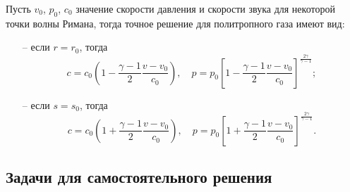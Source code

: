 \documentclass[a4paper, 14pt]{extarticle}
\begin{document}
Пусть $v_0$, $p_0$, $c_0$ значение скорости давления и скорости звука для некоторой точки волны Римана, тогда точное решение для политропного газа имеют вид:
\begin{itemize}
\item[--]
	если $r = r_0$, тогда 
	\begin{equation}
		\label{eq:solution_r_wave}
		c=c_0\left(
		1 - \frac{\gamma-1}{2}\frac{v-v_0}{c_0}
		\right),\quad
		p = p_0 \left[
		1 - \frac{\gamma-1}{2} \frac{v-v_0}{c_0}
		\right]^{\frac{2\gamma}{\gamma-1}};
	\end{equation}
\item[--] если $s = s_0$, тогда
	\begin{equation}
		\label{eq:solution_l_wave}
		c=c_0\left(
		1 + \frac{\gamma-1}{2}\frac{v-v_0}{c_0}
		\right),\quad
		p = p_0 \left[
		1 + \frac{\gamma-1}{2} \frac{v-v_0}{c_0}
		\right]^{\frac{2\gamma}{\gamma-1}}.
	\end{equation}
\end{itemize}

\subsection{Задачи для самостоятельного решения}
\end{document}
